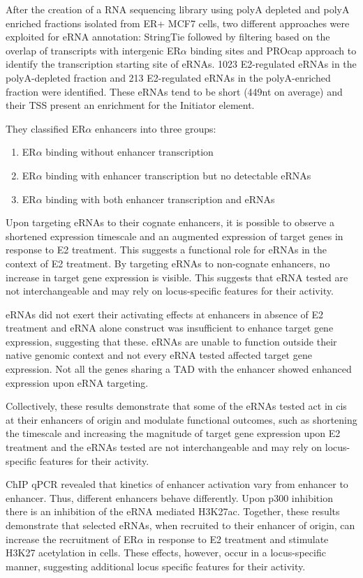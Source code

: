 After the creation of a RNA sequencing library using polyA depleted and polyA enriched fractions
isolated from ER+ MCF7 cells, two different approaches were exploited for eRNA annotation: StringTie followed by filtering based on the overlap of transcripts with intergenic ER$\alpha$ binding sites and PROcap approach to identify the transcription starting site of eRNAs.
1023 E2-regulated eRNAs in the polyA-depleted fraction and 213 E2-regulated
eRNAs in the polyA-enriched fraction were identified.
These eRNAs tend to be short (449nt on average) and their TSS present an enrichment for the Initiator element.

They classified ER$\alpha$ enhancers into three groups:

\begin{enumerate}
\item ER$\alpha$ binding without enhancer transcription
\item ER$\alpha$ binding with enhancer transcription but
no detectable eRNAs
\item ER$\alpha$ binding with both enhancer transcription
and eRNAs
\end{enumerate}

Upon targeting eRNAs to their cognate
enhancers, it is possible to observe a
shortened expression timescale and an
augmented expression of target genes in
response to E2 treatment.
This suggests a functional role for eRNAs in the context of E2 treatment.
By targeting eRNAs to non-cognate enhancers, no
increase in target gene expression is visible.
This suggests that eRNA tested are not
interchangeable and may rely on locus-specific features for their activity.

eRNAs did not exert their activating effects at enhancers in absence of E2 treatment and eRNA alone construct was insufficient to enhance target gene expression, suggesting that these.
eRNAs are unable to function outside their native genomic context and not every eRNA tested affected target gene expression.
Not all the genes sharing a TAD with the enhancer showed enhanced expression upon eRNA
targeting.

Collectively, these results demonstrate that some of the eRNAs tested act in cis at their enhancers of origin and
modulate functional outcomes, such as shortening the timescale
and increasing the magnitude of target gene expression upon E2
treatment and the eRNAs tested are not interchangeable and may rely on locus-
specific features for their activity.

ChIP qPCR revealed that kinetics of enhancer
activation vary from enhancer to
enhancer. Thus, different enhancers
behave differently. Upon p300 inhibition there is an inhibition of the eRNA mediated H3K27ac.
Together, these results demonstrate that selected eRNAs, when
recruited to their enhancer of origin, can increase the recruitment of
ER$\alpha$ in response to E2 treatment and stimulate H3K27 acetylation in
cells. These effects, however, occur in a locus-specific manner,
suggesting additional locus specific features for their activity.

